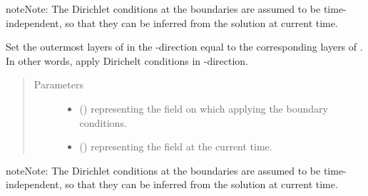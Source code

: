\documentclass[letterpaper,10pt,english]{sphinxmanual}
\begin{document}
\begin{fulllineitems}
\begin{fulllineitems}
\begin{quote}
\begin{description}
\begin{itemize}
\end{itemize}

\end{description}\end{quote}

\begin{sphinxadmonition}{note}{Note:}
The Dirichlet conditions at the boundaries are assumed to be time-independent, so that they
can be inferred from the solution at current time.
\end{sphinxadmonition}

\end{fulllineitems}


\begin{fulllineitems}
\label{\detokenize{api:dycore.horizontal_boundary.Relaxed.set_outermost_layers_y}}
Set the outermost layers of  in the -direction equal to the corresponding
layers of . In other words, apply Dirichelt conditions in -direction.
\begin{quote}\begin{description}
\item[{Parameters}] \leavevmode\begin{itemize}
\item {} 
 () \textendash{}  representing the field on which applying the boundary conditions.

\item {} 
 () \textendash{}  representing the field at the current time.

\end{itemize}

\end{description}\end{quote}

\begin{sphinxadmonition}{note}{Note:}
The Dirichlet conditions at the boundaries are assumed to be time-independent, so that they
can be inferred from the solution at current time.
\end{sphinxadmonition}

\end{fulllineitems}


\end{fulllineitems}
\end{document}
